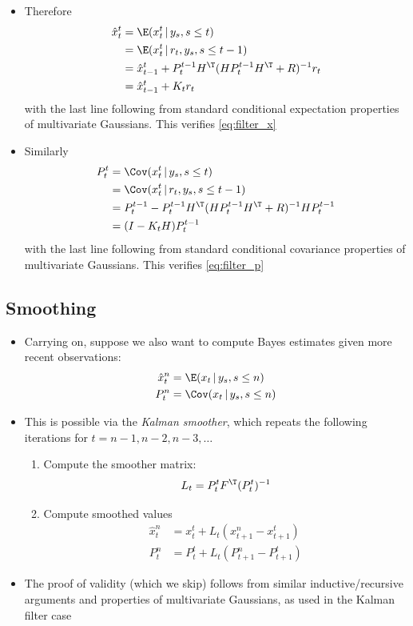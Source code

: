 \documentclass{article}
\begin{document}
\begin{itemize}
\item Therefore 
  \begin{align*}
  \hat{x}_t^t 
  & = \E(x_t^t \,|\, y_s, s \leq t) \\
  & = \E(x_t^t \,|\, r_t, y_s, s \leq t-1) \\
  &= \hat{x}_{t-1}^t + P_t^{t-1} H^\T (H P_t^{t-1} H^\T +  R)^{-1} r_t \\
  &= \hat{x}_{t-1}^t + K_t r_t
  \end{align*}
  with the last line following from standard conditional expectation properties
  of multivariate Gaussians. This verifies \eqref{eq:filter_x}

\item Similarly 
  \begin{align*}
  P_t^t 
  & = \Cov(x_t^t \,|\, y_s, s \leq t) \\
  & = \Cov(x_t^t \,|\, r_t, y_s, s \leq t-1) \\
  &= P_t^{t-1} - P_t^{t-1} H^\T (H P_t^{t-1} H^\T +  R)^{-1} H P_t^{t-1} \\
  &= (I - K_t H) P_t^{t-1}
  \end{align*}
  with the last line following from standard conditional covariance properties
  of multivariate Gaussians. This verifies \eqref{eq:filter_p}
\end{itemize}

\subsection{Smoothing}

\begin{itemize}
\item Carrying on, suppose we also want to compute Bayes estimates given more
  recent observations:  
  \begin{align*}
  \hat{x}_t^n &= \E( x_t \,|\, y_s, s \leq n) \\
  P_t^n &= \Cov( x_t \,|\, y_s, s \leq n ) 
  \end{align*}

\item This is possible via the \emph{Kalman smoother}, which repeats the
  following iterations for $t = n-1,n-2,n-3,\dots$

\begin{enumerate}
\item Compute the smoother matrix: 
  \[
  L_t = P_t^t F^\T ( P_t^t ) ^{-1}
  \]

\item Compute smoothed values
  \begin{align*}
  \hat{x}_t^n &= x_t^t + L_t (x_{t+1}^n - x_{t+1}^t ) \\
  P_t^n &= P_t^t +L_t (P_{t+1}^n - P_{t+1}^t )
  \end{align*}
\end{enumerate}

\item The proof of validity (which we skip) follows from similar
  inductive/recursive arguments and properties of multivariate Gaussians, as
  used in the Kalman filter case 
\end{itemize}
\end{document}

